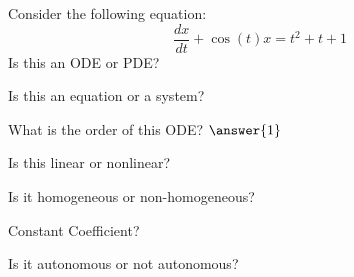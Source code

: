 \documentclass{ximera}
\begin{document}
\begin{exercise}
    Consider the following equation:  
    \[
        \frac{d x}{dt} + \cos(t) x = t^2+t+1
    \]
    Is this an ODE or PDE?
    \begin{multipleChoice}
    \end{multipleChoice}
    \begin{problem}
        Is this an equation or a system?
        \begin{multipleChoice}
        \end{multipleChoice}
        
        \begin{problem}
            What is the order of this ODE? $\answer{1}$
            
            \begin{problem}
                Is this linear or nonlinear?
                \begin{multipleChoice}
                \end{multipleChoice}
                
                \begin{problem}
                    Is it homogeneous or non-homogeneous?
                    \begin{multipleChoice}
                    \end{multipleChoice}
                    
                    \begin{problem}
                        Constant Coefficient?
                        \begin{multipleChoice}
                        \end{multipleChoice}
                    \end{problem}
                \end{problem}
            \end{problem}
        \end{problem}
    \end{problem}
    \begin{problem}
        Is it autonomous or not autonomous?
        \begin{multipleChoice}
        \end{multipleChoice}
    \end{problem}
\end{exercise}
\end{document}
